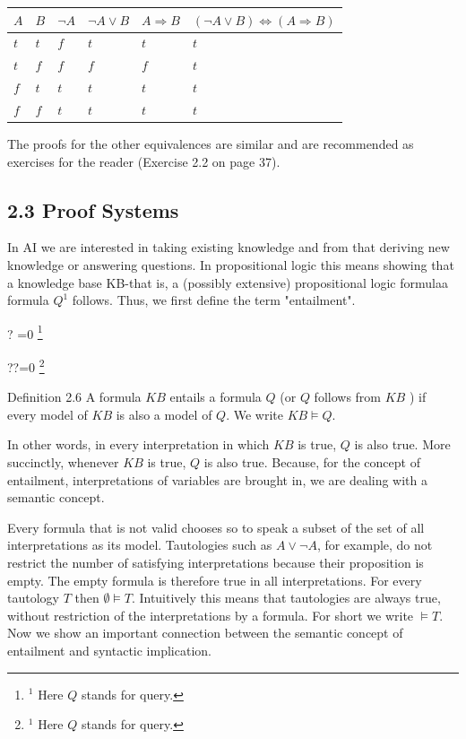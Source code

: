 \documentclass[10pt]{book}
\let\svthefootnote\thefootnote
\newcommand\blfootnotetext[1]{%
  \let\thefootnote\relax\footnote{#1}%
  \addtocounter{footnote}{-1}%
  \let\thefootnote\svthefootnote%
}
\let\svfootnotetext\footnotetext
\renewcommand\footnotetext[2][?]{%
  \if\relax#1\relax%
    \ifnum\value{footnote}=0\blfootnotetext{#2}\else\svfootnotetext{#2}\fi%
  \else%
    \if?#1\ifnum\value{footnote}=0\blfootnotetext{#2}\else\svfootnotetext{#2}\fi%
    \else\svfootnotetext[#1]{#2}\fi%
  \fi
}
\begin{document}
\begin{center}
\begin{tabular}{llllll}
\hline
$A$ & $B$ & $\neg A$ & $\neg A \vee B$ & $A \Rightarrow B$ & $(\neg A \vee B) \Leftrightarrow(A \Rightarrow B)$ \\
\hline
$t$ & $t$ & $f$ & $t$ & $t$ & $t$ \\
\hline
$t$ & $f$ & $f$ & $f$ & $f$ & $t$ \\
\hline
$f$ & $t$ & $t$ & $t$ & $t$ & $t$ \\
\hline
$f$ & $f$ & $t$ & $t$ & $t$ & $t$ \\
\hline
\end{tabular}
\end{center}

The proofs for the other equivalences are similar and are recommended as exercises for the reader (Exercise 2.2 on page 37).

\subsection*{2.3 Proof Systems}
In AI we are interested in taking existing knowledge and from that deriving new knowledge or answering questions. In propositional logic this means showing that a knowledge base KB-that is, a (possibly extensive) propositional logic formulaa formula $Q^{1}$ follows. Thus, we first define the term "entailment".

Definition 2.6 A formula $K B$ entails a formula $Q$ (or $Q$ follows from $K B$ ) if every model of $K B$ is also a model of $Q$. We write $K B \models Q$.

In other words, in every interpretation in which $K B$ is true, $Q$ is also true. More succinctly, whenever $K B$ is true, $Q$ is also true. Because, for the concept of entailment, interpretations of variables are brought in, we are dealing with a semantic concept.

Every formula that is not valid chooses so to speak a subset of the set of all interpretations as its model. Tautologies such as $A \vee \neg A$, for example, do not restrict the number of satisfying interpretations because their proposition is empty. The empty formula is therefore true in all interpretations. For every tautology $T$ then $\emptyset \models T$. Intuitively this means that tautologies are always true, without restriction of the interpretations by a formula. For short we write $\models T$. Now we show an important connection between the semantic concept of entailment and syntactic implication.
\end{document}
